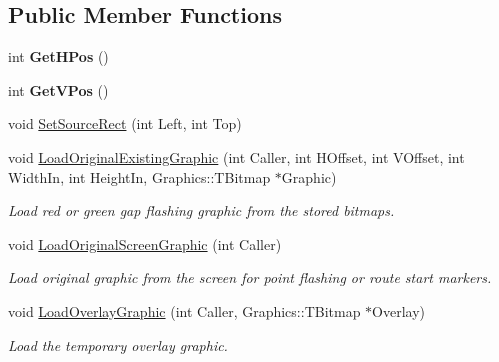 \subsection*{Public Member Functions}
\begin{DoxyCompactItemize}
\item 
\mbox{\label{class_t_graphic_element_aaf109e208515c9b9aaad753d829d25e9}} 
int {\bfseries Get\+H\+Pos} ()
\item 
\mbox{\label{class_t_graphic_element_ad2780e85ae1e401bfbb6a7c37b15bea8}} 
int {\bfseries Get\+V\+Pos} ()
\item 
void \mbox{\hyperlink{class_t_graphic_element_adffdc9f9c4a5fff5cbeab6b5a027dad9}{Set\+Source\+Rect}} (int Left, int Top)
\item 
\mbox{\label{class_t_graphic_element_a6c3759e5c5a639ef98c3470363c48988}} 
void \mbox{\hyperlink{class_t_graphic_element_a6c3759e5c5a639ef98c3470363c48988}{Load\+Original\+Existing\+Graphic}} (int Caller, int H\+Offset, int V\+Offset, int Width\+In, int Height\+In, Graphics\+::\+T\+Bitmap $\ast$Graphic)
\begin{DoxyCompactList}\small\item\em Load red or green gap flashing graphic from the stored bitmaps. \end{DoxyCompactList}\item 
\mbox{\label{class_t_graphic_element_ac12f60cb52eefdc86eaa504419eb138d}} 
void \mbox{\hyperlink{class_t_graphic_element_ac12f60cb52eefdc86eaa504419eb138d}{Load\+Original\+Screen\+Graphic}} (int Caller)
\begin{DoxyCompactList}\small\item\em Load original graphic from the screen for point flashing or route start markers. \end{DoxyCompactList}\item 
\mbox{\label{class_t_graphic_element_a82c786873b196ec443f052dedac8b1c1}} 
void \mbox{\hyperlink{class_t_graphic_element_a82c786873b196ec443f052dedac8b1c1}{Load\+Overlay\+Graphic}} (int Caller, Graphics\+::\+T\+Bitmap $\ast$Overlay)
\begin{DoxyCompactList}\small\item\em Load the temporary overlay graphic. \end{DoxyCompactList}\item 

\end{DoxyCompactItemize}
